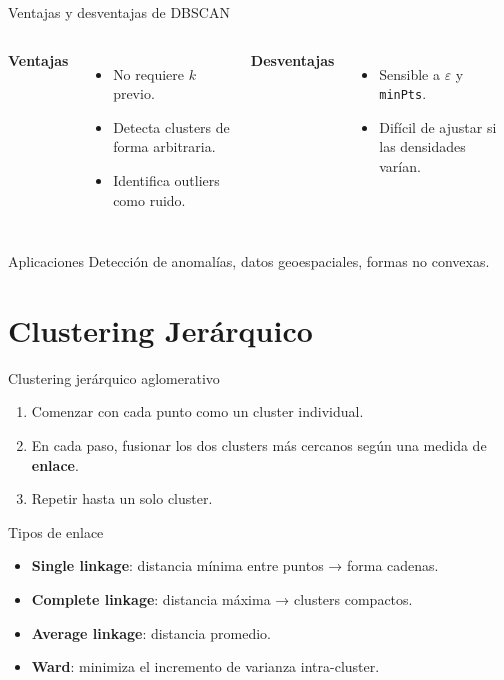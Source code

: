 \documentclass[aspectratio=169, 10pt, xcolor=table]{beamer}
\begin{document}
\begin{frame}{Ventajas y desventajas de DBSCAN}
    \begin{columns}[t]
        \textbf{Ventajas}
        \begin{itemize}
            \item No requiere $k$ previo.
            \item Detecta clusters de forma arbitraria.
            \item Identifica outliers como ruido.
        \end{itemize}
        \textbf{Desventajas}
        \begin{itemize}
            \item Sensible a $\varepsilon$ y \texttt{minPts}.
            \item Difícil de ajustar si las densidades varían.
        \end{itemize}
    \end{columns}
    \vspace{0.3cm}
    \begin{exampleblock}{Aplicaciones}
        Detección de anomalías, datos geoespaciales, formas no convexas.
    \end{exampleblock}
\end{frame}

\section{Clustering Jerárquico}

\begin{frame}{Clustering jerárquico aglomerativo}
    \begin{enumerate}
        \item Comenzar con cada punto como un cluster individual.
        \item En cada paso, fusionar los dos clusters más cercanos según una medida de \textbf{enlace}.
        \item Repetir hasta un solo cluster.
    \end{enumerate}
    \vspace{0.3cm}
    \begin{block}{Tipos de enlace}
        \begin{itemize}
            \item \textbf{Single linkage}: distancia mínima entre puntos → forma cadenas.
            \item \textbf{Complete linkage}: distancia máxima → clusters compactos.
            \item \textbf{Average linkage}: distancia promedio.
            \item \textbf{Ward}: minimiza el incremento de varianza intra-cluster.
        \end{itemize}
    \end{block}
\end{frame}
\end{document}
